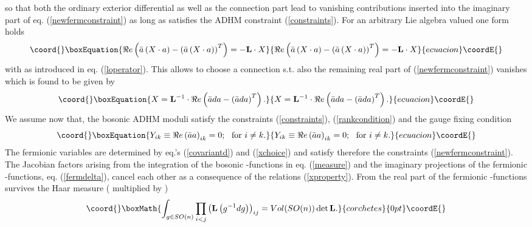\documentclass[a4paper,12pt]{article}
\begin{document}
so that both the ordinary exterior differential as well as 
the \coordHE{} connection part lead to vanishing contributions 
inserted into the imaginary part of eq. 
(\ref{newfermconstraint}) as long as \coordHE{} satisfies the ADHM 
constraint (\ref{constraints}). For an arbitrary \coordHE{} Lie 
algebra valued one form \coordHE{} holds 
\begin{equation}\coord{}\boxEquation{
\Re e \left(\bar{a}\left(X\cdot a\right)-
\left(\bar{a}\left(X\cdot a\right)\right)^T \right)=-{\bf L}\cdot X 
\nonumber 
}{
\Re e \left(\bar{a}\left(X\cdot a\right)-
\left(\bar{a}\left(X\cdot a\right)\right)^T \right)=-{\bf L}\cdot X 
\nonumber 
}{ecuacion}\coordE{}\end{equation}
with \coordHE{} as introduced in eq. (\ref{loperator}). This allows 
to choose a connection s.t. also the remaining real part of 
(\ref{newfermconstraint}) vanishes which is found to be given by 
\begin{equation}\coord{}\boxEquation{
X={\bf L}^{-1}\cdot \Re e \left(\bar{a}da-
\left(\bar{a}da\right)^T\right).
\label{xchoice}
}{
X={\bf L}^{-1}\cdot \Re e \left(\bar{a}da-
\left(\bar{a}da\right)^T\right).
}{ecuacion}\coordE{}\end{equation}    
We assume now that, the bosonic ADHM moduli \coordHE{} satisfy the 
constraints (\ref{constraints}), (\ref{rankcondition}) and the gauge 
fixing condition 
\begin{equation}\coord{}\boxEquation{
Y_{ik}\equiv \Re e \left(\bar{a}a\right)_{ik}= 0; \,\,\,\, \mbox{for} \, \, 
i\neq k. \nonumber 
}{
Y_{ik}\equiv \Re e \left(\bar{a}a\right)_{ik}= 0; \,\,\,\, \mbox{for} \, \, 
i\neq k. \nonumber 
}{ecuacion}\coordE{}\end{equation}
The fermionic variables are determined by eq.'s (\ref{covariantd}) and 
(\ref{xchoice}) and satisfy therefore the constraints 
(\ref{newfermconstraint}). The Jacobian factors arising from the 
integration of the bosonic \myHighlight{$\delta$}\coordHE{}-functions in eq. (\ref{measure}) 
and the imaginary projections of the fermionic \myHighlight{$\delta$}\coordHE{}-functions, eq. 
(\ref{fermdelta}), cancel each other as a consequence of the 
relations (\ref{xproperty}). From the real part of the fermionic 
\myHighlight{$\delta$}\coordHE{}-functions survives the \coordHE{} Haar measure (
multiplied by \coordHE{})
\[\coord{}\boxMath{
\int_{g\in SO(n)}\prod_{i<j}\left({\bf L}\left(g^{-1}dg\right)\right)_{ij} 
=Vol(SO(n)) \det {\bf L}.
}{corchetes}{0pt}\coordE{}\]  
\end{document}
